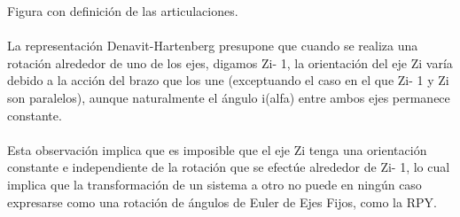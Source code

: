 \documentclass[12pt,a4paper]{article}
\begin{document}
Figura con definición de las articulaciones.
\\\\
La representación Denavit-Hartenberg presupone que cuando se realiza una rotación alrededor de uno de los ejes, digamos Zi- 1, la orientación del eje Zi varía debido a la acción del brazo que los une (exceptuando el caso en el que Zi- 1 y Zi son paralelos), aunque naturalmente el ángulo i(alfa) entre ambos ejes permanece constante. 
\\\\
Esta observación implica que es imposible que el eje Zi tenga una orientación constante e independiente de la rotación que se efectúe alrededor de Zi- 1, lo cual implica que la transformación de un sistema a otro no puede en ningún caso expresarse como una rotación de ángulos de Euler de Ejes Fijos, como la RPY.
\end{document}
